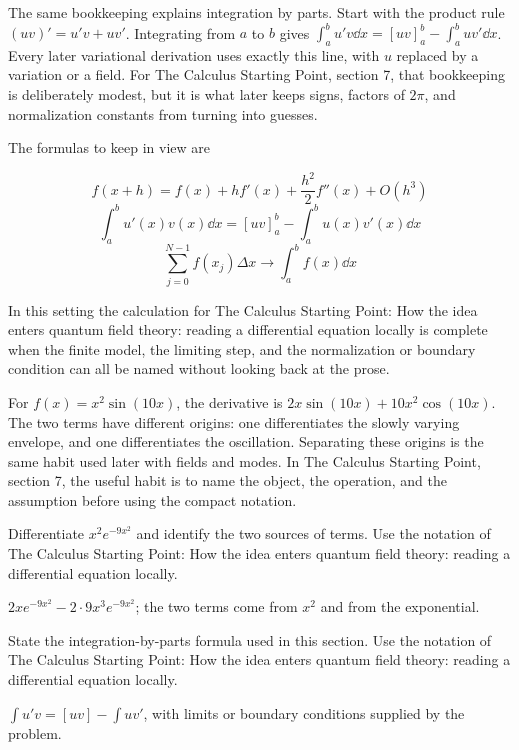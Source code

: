 The same bookkeeping explains integration by parts.  Start with the product rule \((uv)'=u'v+uv'\).  Integrating from \(a\) to \(b\) gives \(\int_a^b u'v\dd x=[uv]_a^b-\int_a^buv'\dd x\).  Every later variational derivation uses exactly this line, with \(u\) replaced by a variation or a field.  For The Calculus Starting Point, section 7, that bookkeeping is deliberately modest, but it is what later keeps signs, factors of \(2\pi\), and normalization constants from turning into guesses.

The formulas to keep in view are

\[
  f(x+h)=f(x)+hf'(x)+\frac{h^2}{2}f''(x)+O(h^3)
\]
\[
  \int_a^b u'(x)v(x)\dd x=[uv]_a^b-\int_a^b u(x)v'(x)\dd x
\]
\[
  \sum_{j=0}^{N-1}f(x_j)\Delta x\longrightarrow \int_a^b f(x)\dd x
\]

In this setting the calculation for The Calculus Starting Point: How the idea enters quantum field theory: reading a differential equation locally is complete when the finite model, the limiting step, and the normalization or boundary condition can all be named without looking back at the prose.




\begin{example}
For \(f(x)=x^2\sin(10x)\), the derivative is \(2x\sin(10x)+10x^2\cos(10x)\).  The two terms have different origins: one differentiates the slowly varying envelope, and one differentiates the oscillation.  Separating these origins is the same habit used later with fields and modes.  In The Calculus Starting Point, section 7, the useful habit is to name the object, the operation, and the assumption before using the compact notation.
\end{example}



\begin{exercise}
Differentiate \(x^2e^{-9x^2}\) and identify the two sources of terms.  Use the notation of The Calculus Starting Point: How the idea enters quantum field theory: reading a differential equation locally.
\begin{answer}
\(2xe^{-9x^2}-2\cdot 9x^3e^{-9x^2}\); the two terms come from \(x^2\) and from the exponential.
\end{answer}
\end{exercise}

\begin{exercise}
State the integration-by-parts formula used in this section.  Use the notation of The Calculus Starting Point: How the idea enters quantum field theory: reading a differential equation locally.
\begin{answer}
\(\int u'v=[uv]-\int uv'\), with limits or boundary conditions supplied by the problem.
\end{answer}
\end{exercise}



